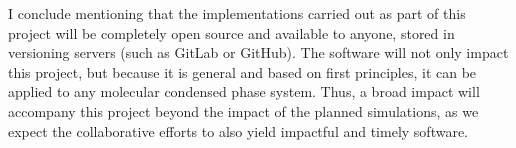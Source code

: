 \documentclass[notitlepage,12pt]{report}
\begin{document}
    I conclude mentioning that the implementations carried out as part of this project will be completely open source and available to anyone, stored in versioning servers (such as GitLab or GitHub). The software will not only impact this project, but because it is general and based on first principles, it can be applied to any molecular condensed phase system. Thus, a broad impact will accompany this project beyond the impact of the planned simulations, as we expect the collaborative efforts to also yield impactful and timely software.
\printbibliography
\end{document}
